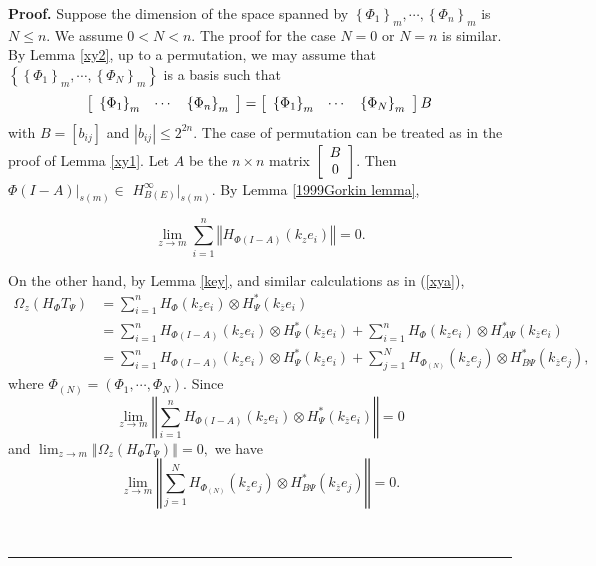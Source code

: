 \documentclass{article}%
\newenvironment{proof}[1][Proof]{\noindent\textbf{#1.} }{\ \rule{0.5em}{0.5em}}
\begin{document}
\begin{proof}
Suppose the dimension of the space spanned by $\left\{  \Phi_{1}\right\}
_{m},\cdots,\left\{  \Phi_{n}\right\}  _{m}$ is $N\leq n$. We assume $0<N<n.$
The proof for the case $N=0$ or $N=n$ is similar. By Lemma \ref{xy2}, up to a
permutation, we may assume that $\left\{  \left\{  \Phi_{1}\right\}
_{m},\cdots,\left\{  \Phi_{N}\right\}  _{m}\right\}  $ is a basis such that
\[
\left[
\begin{array}
[c]{ccc}%
\left\{  \Phi_{1}\right\}  _{m} & \cdots & \left\{  \Phi_{n}\right\}  _{m}%
\end{array}
\right]  =\left[
\begin{array}
[c]{ccc}%
\left\{  \Phi_{1}\right\}  _{m} & \cdots & \left\{  \Phi_{N}\right\}  _{m}%
\end{array}
\right]  B
\]
with $B=\left[  b_{ij}\right]  $ and $\left\vert b_{ij}\right\vert \leq2^{2n}%
$. The case of permutation can be treated as in the proof of Lemma \ref{xy1}.
Let $A$ be the $n\times n$ matrix $\left[
\begin{array}
[c]{c}%
B\\
0
\end{array}
\right]  $. Then $\Phi(I-A)|_{s(m)}\in$ $H_{B(E)}^{\infty}|_{s(m)}$. By Lemma
\ref{1999Gorkin lemma},%

\[
\lim_{z\rightarrow m}\sum_{i=1}^{n}\left\Vert H_{\Phi(I-A)}\left(  k_{z}%
e_{i}\right)  \right\Vert =0.
\]


On the other hand, by Lemma \ref{key}, and similar calculations as in
(\ref{xya}),
\begin{align*}
\Omega_{z}(H_{\Phi}T_{\Psi})  &  =\sum_{i=1}^{n}H_{\Phi}\left(  k_{z}%
e_{i}\right)  \otimes H_{\Psi}^{\ast}\left(  k_{\overline{z}}e_{i}\right) \\
&  =\sum_{i=1}^{n}H_{\Phi(I-A)}\left(  k_{z}e_{i}\right)  \otimes H_{\Psi
}^{\ast}\left(  k_{\overline{z}}e_{i}\right)  +\sum_{i=1}^{n}H_{\Phi}\left(
k_{z}e_{i}\right)  \otimes H_{A\Psi}^{\ast}\left(  k_{\overline{z}}%
e_{i}\right) \\
&  =\sum_{i=1}^{n}H_{\Phi(I-A)}\left(  k_{z}e_{i}\right)  \otimes H_{\Psi
}^{\ast}\left(  k_{\overline{z}}e_{i}\right)  +\sum_{j=1}^{N}H_{\Phi_{(N)}%
}\left(  k_{z}e_{j}\right)  \otimes H_{B\Psi}^{\ast}\left(  k_{\overline{z}%
}e_{j}\right)  ,
\end{align*}
where $\Phi_{(N)}=\left(  \Phi_{1},\cdots,\Phi_{N}\right)  $. Since
\[
\lim_{z\rightarrow m}\left\Vert \sum_{i=1}^{n}H_{\Phi(I-A)}\left(  k_{z}%
e_{i}\right)  \otimes H_{\Psi}^{\ast}\left(  k_{\overline{z}}e_{i}\right)
\right\Vert =0
\]
and $\lim_{z\rightarrow m}\left\Vert \Omega_{z}(H_{\Phi}T_{\Psi})\right\Vert
=0,$ we have
\begin{equation}
\lim_{z\rightarrow m}\left\Vert \sum_{j=1}^{N}H_{\Phi_{(N)}}\left(  k_{z}%
e_{j}\right)  \otimes H_{B\Psi}^{\ast}\left(  k_{\overline{z}}e_{j}\right)
\right\Vert =0. \label{phin}%
\end{equation}



\end{proof}
\end{document}
